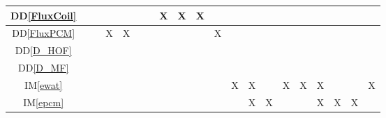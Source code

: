 \documentclass[12pt]{article}
\newcommand{\ddref}[1]{DD\ref{#1}}
\newcommand{\iref}[1]{IM\ref{#1}}
\begin{document}
{\begin{landscape}
\begin{table}[h!]
\begin{tabular}{|c|c|c|c|c|c|c|c|c|c|c|c|c|c|c|c|c|c|c|c|}
        \ddref{FluxCoil}    &                            &                 &                &               &                        &                  & X                  & X              & X               &                   &                 &                   &                     &                  &                &                   &               &                    &                   \\ \hline
        \ddref{FluxPCM}     &                            &                 & X              & X             &                        &                  &                    &                &                 & X                 &                 &                   &                     &                  &                &                   &               &                    &                   \\ \hline
        \ddref{D_HOF}       &                            &                 &                &               &                        &                  &                    &                &                 &                   &                 &                   &                     &                  &                &                   &               &                    &                   \\ \hline
        \ddref{D_MF}        &                            &                 &                &               &                        &                  &                    &                &                 &                   &                 &                   &                     &                  &                &                   &               &                    &                   \\ \hline
        \iref{ewat}         &                            &                 &                &               &                        &                  &                    &                &                 &                   & X               & X                 &                     & X                & X              & X                 &               &                    & X                 \\ \hline
        \iref{epcm}         &                            &                 &                &               &                        &                  &                    &                &                 &                   &                 & X                 & X                   &                  &                & X                 & X             & X                  &                   \\ \hline

\end{tabular}
\end{table}
\end{landscape}}
\end{document}
